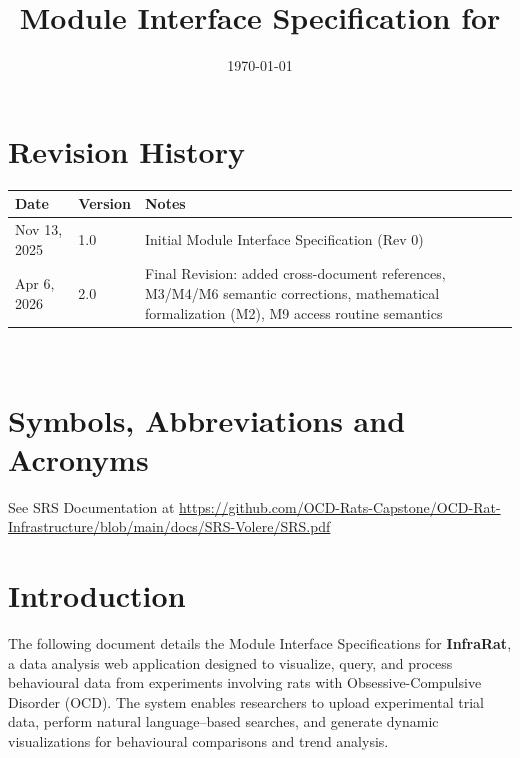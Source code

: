 \documentclass[12pt, titlepage]{article}
\begin{document}
\sloppy

\title{Module Interface Specification for \progname{}}

\author{\authname}

\date{\today}

\maketitle


\section{Revision History}

\begin{tabularx}{\textwidth}{p{3cm}p{2cm}X}
\toprule {\bf Date} & {\bf Version} & {\bf Notes}\\
\midrule
Nov 13, 2025 & 1.0 & Initial Module Interface Specification (Rev 0)\\
Apr 6, 2026 & 2.0 & Final Revision: added cross-document references, M3/M4/M6 semantic corrections, mathematical formalization (M2), M9 access routine semantics\\
\bottomrule
\end{tabularx}

~\newpage

\section{Symbols, Abbreviations and Acronyms}

See SRS Documentation at \url{https://github.com/OCD-Rats-Capstone/OCD-Rat-Infrastructure/blob/main/docs/SRS-Volere/SRS.pdf}

\newpage

\tableofcontents

\newpage


\section{Introduction}

The following document details the Module Interface Specifications for
\textbf{InfraRat}, a data analysis web application designed to visualize, query, and process behavioural data from experiments involving rats with Obsessive-Compulsive Disorder (OCD). The system enables researchers to upload experimental trial data, perform natural language–based searches, and generate dynamic visualizations for behavioural comparisons and trend analysis.
\end{document}
